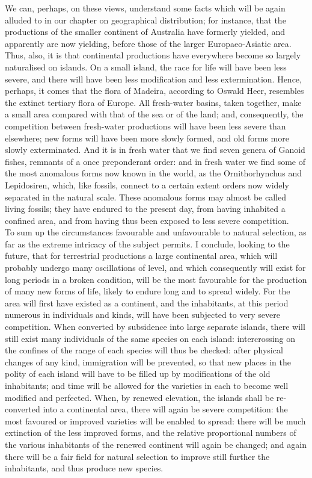 \indent We can, perhaps, on these views, understand some facts which will be again alluded to in our chapter on geographical distribution; for instance, that the productions of the smaller continent of Australia have formerly yielded, and apparently are now yielding, before those of the larger Europaeo-Asiatic area. Thus, also, it is that continental productions have everywhere become so largely naturalised on islands. On a small island, the race for life will have been less severe, and there will have been less modification and less extermination.  Hence, perhaps, it comes that the flora of Madeira, according to Oswald Heer, resembles the extinct tertiary flora of Europe.  All fresh-water basins, taken together, make a small area compared with that of the sea or of the land; and, consequently, the competition between fresh-water productions will have been less severe than elsewhere; new forms will have been more slowly formed, and old forms more slowly exterminated. And it is in fresh water that we find seven genera of Ganoid fishes, remnants of a once preponderant order: and in fresh water we find some of the most anomalous forms now known in the world, as the Ornithorhynchus and Lepidosiren, which, like fossils, connect to a certain extent orders now widely separated in the natural scale. These anomalous forms may almost be called living fossils; they have endured to the present day, from having inhabited a confined area, and from having thus been exposed to less severe competition. \\
\indent To sum up the circumstances favourable and unfavourable to natural selection, as far as the extreme intricacy of the subject permits. I conclude, looking to the future, that for terrestrial productions a large continental area, which will probably undergo many oscillations of level, and which consequently will exist for long periods in a broken condition, will be the most favourable for the production of many new forms of life, likely to endure long and to spread widely. For the area will first have existed as a continent, and the inhabitants, at this period numerous in individuals and kinds, will have been subjected to very severe competition. When converted by subsidence into large separate islands, there will still exist many individuals of the same species on each island: intercrossing on the confines of the range of each species will thus be checked: after physical changes of any kind, immigration will be prevented, so that new places in the polity of each island will have to be filled up by modifications of the old inhabitants; and time will be allowed for the varieties in each to become well modified and perfected. When, by renewed elevation, the islands shall be re-converted into a continental area, there will again be severe competition: the most favoured or improved varieties will be enabled to spread: there will be much extinction of the less improved forms, and the relative proportional numbers of the various inhabitants of the renewed continent will again be changed; and again there will be a fair field for natural selection to improve still further the inhabitants, and thus produce new species. \\

